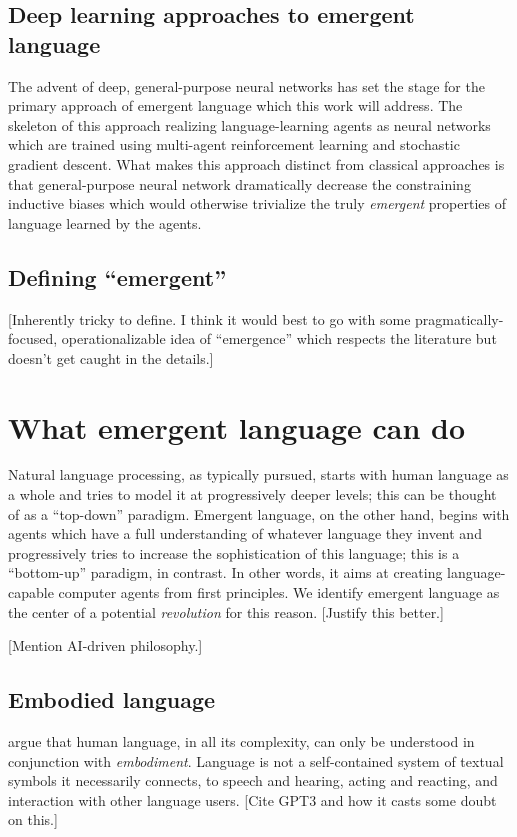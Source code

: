 \documentclass[letterpaper]{report}
\newcommand\bjb[1]{{\color{blue}[#1]}}
\newcommand\cmg[1]{{\color{gray}[#1]}}
\begin{document}
\subsection{Deep learning approaches to emergent language}
The advent of deep, general-purpose neural networks has set the stage for the primary approach of emergent language which this work will address.
The skeleton of this approach realizing language-learning agents as neural networks which are trained using multi-agent reinforcement learning and stochastic gradient descent.
What makes this approach distinct from classical approaches is that general-purpose neural network dramatically decrease the constraining inductive biases which would otherwise trivialize the truly \emph{emergent} properties of language learned by the agents.

\subsection{Defining ``emergent''}
\bjb{Inherently tricky to define. I think it would best to go with some pragmatically-focused, operationalizable idea of ``emergence'' which respects the literature but doesn't get caught in the details.}

\section{What emergent language can do}
Natural language processing, as typically pursued, starts with human language as a whole and tries to model it at progressively deeper levels; this can be thought of as a ``top-down'' paradigm.
Emergent language, on the other hand, begins with agents which have a full understanding of whatever language they invent and progressively tries to increase the sophistication of this language; this is a ``bottom-up'' paradigm, in contrast.
In other words, it aims at creating language-capable computer agents from first principles.
We identify emergent language as the center of a potential \emph{revolution} for this reason.
\cmg{Justify this better.}

\cmg{Mention AI-driven philosophy.}

\subsection{Embodied language}
\citet{bisk_experience_2020} argue that human language, in all its complexity, can only be understood in conjunction with \emph{embodiment}.
Language is not a self-contained system of textual symbols it necessarily connects, to speech and hearing, acting and reacting, and interaction with other language users.
\cmg{Cite GPT3 and how it casts some doubt on this.}
\end{document}
